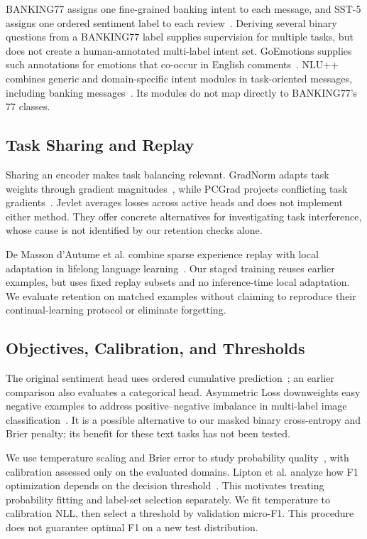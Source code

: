 \documentclass[conference]{IEEEtran}
\begin{document}
BANKING77 assigns one fine-grained banking intent to each message, and SST-5 assigns one ordered sentiment label to each review~\cite{banking,sst}. Deriving several binary questions from a BANKING77 label supplies supervision for multiple tasks, but does not create a human-annotated multi-label intent set. GoEmotions supplies such annotations for emotions that co-occur in English comments~\cite{goemotions}. NLU++ combines generic and domain-specific intent modules in task-oriented messages, including banking messages~\cite{nlupp}. Its modules do not map directly to BANKING77's 77 classes.

\subsection{Task Sharing and Replay}
Sharing an encoder makes task balancing relevant. GradNorm adapts task weights through gradient magnitudes~\cite{gradnorm}, while PCGrad projects conflicting task gradients~\cite{pcgrad}. Jevlet averages losses across active heads and does not implement either method. They offer concrete alternatives for investigating task interference, whose cause is not identified by our retention checks alone.

De Masson d'Autume et al. combine sparse experience replay with local adaptation in lifelong language learning~\cite{episodic_memory}. Our staged training reuses earlier examples, but uses fixed replay subsets and no inference-time local adaptation. We evaluate retention on matched examples without claiming to reproduce their continual-learning protocol or eliminate forgetting.

\subsection{Objectives, Calibration, and Thresholds}
The original sentiment head uses ordered cumulative prediction~\cite{coral}; an earlier comparison also evaluates a categorical head. Asymmetric Loss downweights easy negative examples to address positive--negative imbalance in multi-label image classification~\cite{asymmetric_loss}. It is a possible alternative to our masked binary cross-entropy and Brier penalty; its benefit for these text tasks has not been tested.

We use temperature scaling and Brier error to study probability quality~\cite{guo,brier}, with calibration assessed only on the evaluated domains. Lipton et al. analyze how F1 optimization depends on the decision threshold~\cite{f1_threshold}. This motivates treating probability fitting and label-set selection separately. We fit temperature to calibration NLL, then select a threshold by validation micro-F1. This procedure does not guarantee optimal F1 on a new test distribution.
\end{document}
